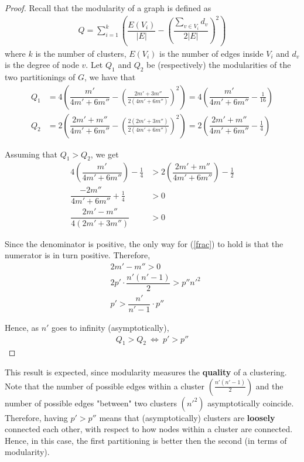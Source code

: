 \begin{proof}
	Recall that the modularity\cite{mod} of a graph is defined as
	\begin{align*}
		Q = \sum_{i = 1}^{k} \left( \dfrac{E(V_i)}{|E|} - \left( \dfrac{\sum_{v \in V_i} d_v}{2|E|} \right)^2 \right) 
	\end{align*}
	where $k$ is the number of clusters, $E(V_i)$ is the number of edges inside $V_i$ and $d_v$ is the degree of node $v$. Let $Q_1$ and $Q_2$ be  (respectively) the modularities of the two partitionings of $G$, we have that
	\begin{align*}
		Q_1 &= 4 \left( \dfrac{m'}{4m' + 6m''} - \left( \frac{2m' + 3m''}{2(4m' + 6m'')} \right)^2 \right) = 4 \left( \dfrac{m'}{4m' + 6m''} - \frac{1}{16} \right)\\
		Q_2 &= 2 \left( \dfrac{2m' + m''}{4m' + 6m''} - \left( \frac{2(2m' + 3m'')}{2(4m' + 6m'')} \right)^2 \right) = 2 \left( \dfrac{2m' + m''}{4m' + 6m''} - \frac{1}{4} \right) 
	\end{align*}
	
	\medskip
	\noindent Assuming that $Q_1 > Q_2$, we get
	\begin{align}
		4 \left( \dfrac{m'}{4m' + 6m''} \right) - \frac{1}{4} &> 2 \left( \dfrac{2m' + m''}{4m' + 6m''} \right) - \frac{1}{2} \nonumber\\ 
		\dfrac{- 2m''}{4m' + 6m''} + \frac{1}{4} &> 0 \nonumber\\ 
		\dfrac{2m' - m''}{4(2m' + 3m'')} &> 0 \label{frac}
	\end{align}
	
	\medskip
	\noindent Since the denominator is positive, the only way for (\ref{frac}) to hold is that the numerator is in turn positive. Therefore,
	\begin{align*}
		&2m' - m'' > 0\\
		&2p' \cdot \dfrac{n'(n'-1)}{2} > p''n'^2\\
		&p' > \dfrac{n'}{n'-1} \cdot p''
	\end{align*}
	
	\medskip
	\noindent Hence, as $n'$ goes to infinity (asymptotically),
	\begin{align*}
		Q_1 > Q_2 \ \Leftrightarrow \ p' > p''
	\end{align*}
\end{proof}

\medskip
\noindent This result is expected, since modularity measures the \textbf{quality} of a clustering.\\
Note that the number of possible edges within a cluster $\left( \frac{n'(n'-1)}{2} \right)$ and the number of possible edges "between" two clusters $\left( n'^2 \right)$ asymptotically coincide. Therefore, having $p' > p''$ means that (asymptotically) clusters are \textbf{loosely} connected each other, with respect to how nodes within a cluster are connected. Hence, in this case, the first partitioning is better then the second (in terms of modularity).
